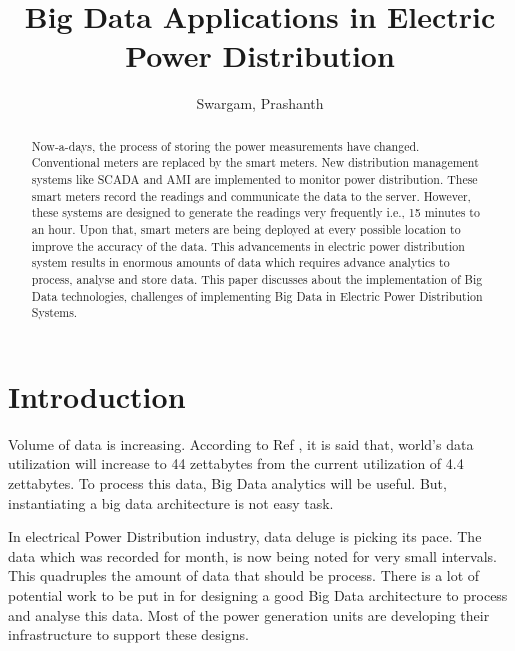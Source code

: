 \documentclass[sigconf]{acmart}
\begin{document}
\title{Big Data Applications in Electric Power Distribution}


\author{Swargam, Prashanth}


\renewcommand{\shortauthors}{B. Trovato et al.}


\begin{abstract}
Now-a-days, the process of storing the power measurements have changed. Conventional meters are replaced by the smart meters. New distribution management systems like SCADA and AMI are implemented to monitor power distribution. These smart meters record the readings and communicate the data to the server. However, these systems are designed to generate the readings very frequently i.e., 15 minutes to an hour. Upon that, smart meters are being deployed at every possible location to improve the accuracy of the data. This advancements in electric power distribution system results in enormous amounts of data which requires advance analytics to process, analyse and store data. This paper discusses about the implementation of Big Data technologies, challenges of implementing Big Data in Electric Power Distribution Systems.
\end{abstract}


\maketitle

\section{Introduction}

Volume of data is increasing. According to Ref \cite{44zeta}, it is said that, world's data utilization will increase to 44 zettabytes from the current utilization of 4.4 zettabytes. To process this data, Big Data analytics will be useful. But, instantiating a big data architecture is not easy task. 

In electrical Power Distribution industry, data deluge is picking its pace. The data which was recorded for month, is now being noted for very small intervals. This quadruples  the amount of data that should be process. There is a lot of potential work to be put in for designing a good Big Data architecture to process and analyse this data. Most of the power generation units are developing their infrastructure to support these designs.
\end{document}
